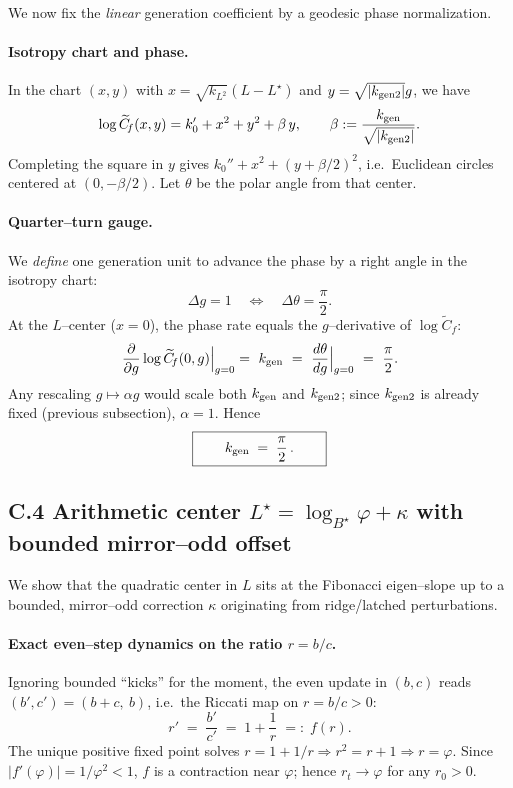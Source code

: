\documentclass[12pt]{article}
\numberwithin{equation}{section}
\begin{document}
\medskip
We now fix the \emph{linear} generation coefficient by a geodesic phase normalization.

\paragraph{Isotropy chart and phase.}
In the chart $(x,y)$ with $x=\sqrt{k_{L^2}}(L-L^\star)$ and $y=\sqrt{|k_{\rm gen2}|}g$, we have
\[
\log \widetilde{C}_{\!f}(x,y)=k_0'+x^2+y^2+\beta\,y,\qquad \beta:=\frac{k_{\rm gen}}{\sqrt{|k_{\rm gen2}|}}.
\]
Completing the square in $y$ gives $k_0''+x^2+(y+\beta/2)^2$, i.e.\ Euclidean circles centered at $(0,-\beta/2)$.  Let $\theta$ be the polar angle from that center.

\paragraph{Quarter–turn gauge.}
We \emph{define} one generation unit to advance the phase by a right angle in the isotropy chart:
\[
\Delta g=1\quad\Longleftrightarrow\quad \Delta\theta=\frac{\pi}{2}.
\]
At the $L$–center ($x=0$), the phase rate equals the $g$–derivative of $\log \widetilde{C}_{\!f}$:
\[
\frac{\partial}{\partial g}\log \widetilde{C}_{\!f}(0,g)\Big|_{g=0}
=\ k_{\rm gen}
\ =\ \frac{d\theta}{dg}\Big|_{g=0}
\ =\ \frac{\pi}{2}.
\]
Any rescaling $g\mapsto \alpha g$ would scale both $k_{\rm gen}$ and $k_{\rm gen2}$; since $k_{\rm gen2}$ is already fixed (previous subsection), $\alpha=1$.  Hence
\[
\boxed{\qquad k_{\rm gen}\;=\;\frac{\pi}{2}\,.\qquad}
\]

\bigskip
\subsection*{C.4 \; Arithmetic center $L^\star=\log_{B^\star}\varphi+\kappa$ with bounded mirror–odd offset}

We show that the quadratic center in $L$ sits at the Fibonacci eigen–slope up to a bounded, mirror–odd correction $\kappa$ originating from ridge/latched perturbations.

\paragraph{Exact even–step dynamics on the ratio $r=b/c$.}
Ignoring bounded ``kicks'' for the moment, the even update in $(b,c)$ reads $(b',c')=(b+c,\ b)$, i.e.\ the Riccati map on $r=b/c>0$:
\[
r'\;=\;\frac{b'}{c'}\;=\;1+\frac{1}{r}\;=:\;f(r).
\]
The unique positive fixed point solves $r=1+1/r\Rightarrow r^2=r+1\Rightarrow r=\varphi$.  Since $|f'(\varphi)|=1/\varphi^2<1$, $f$ is a contraction near $\varphi$; hence $r_t\to\varphi$ for any $r_0>0$.
\end{document}
